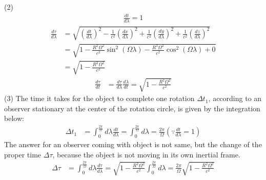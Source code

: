 \documentclass[12pt]{article}
\begin{document}
(2)
\begin{align*}
\frac{d t}{d \lambda} = 1
\end{align*}
\begin{align*}
\frac{d \tau}{d \lambda} &= \sqrt{\left(\frac{d t}{d \lambda}\right)^2 - \frac{1}{c^2} \left(\frac{d x}{d \lambda}\right)^2 + \frac{1}{c^2} \left(\frac{d y}{d \lambda}\right)^2 + \frac{1}{c^2} \left(\frac{d z}{d \lambda}\right)^2}\\[1em]
&= \sqrt{1 - \frac{R^2 \Omega^2}{c^2} \sin^2(\Omega \lambda) - \frac{R^2 \Omega^2}{c^2} \cos^2(\Omega \lambda) + 0}\\[1em]
&= \sqrt{1 - \frac{R^2 \Omega^2}{c^2}}
\end{align*}
\begin{align*}
\frac{d \tau}{d t} &= \frac{d \tau}{d \lambda}\frac{d \lambda}{d t} = \sqrt{1 - \frac{R^2 \Omega^2}{c^2}}
\end{align*}
(3)
The time it takes for the object to complete one rotation $\Delta t_1$, according to an observer stationary at the center of the rotation circle, is given by the integration below:
\begin{align*}
\Delta t_1 &= \int_{0}^{\frac{2 \pi}{\Omega}} d \lambda \frac{d t}{d \lambda} = \int_{0}^{\frac{2 \pi}{\Omega}} d \lambda = \frac{2 \pi}{\Omega} \left(\because \frac{d t}{d \lambda} = 1\right)
\end{align*}
The answer for an observer coming with object is not same, but the change of the proper time $\Delta \tau$, because the object is not moving in its own inertial frame.
\begin{align*}
\Delta \tau &= \int_{0}^{\frac{2 \pi}{\Omega}} d \lambda \frac{d \tau}{d \lambda} = \sqrt{1 - \frac{R^2 \Omega^2}{c^2}} \int_{0}^{\frac{2 \pi}{\Omega}} d \lambda = \frac{2 \pi}{\Omega} \sqrt{1 - \frac{R^2 \Omega^2}{c^2}}
\end{align*}
\end{document}
